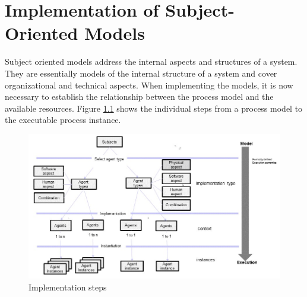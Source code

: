 
\chapter{Implementation of Subject-Oriented Models}

Subject oriented models address the internal aspects and structures of a system. They are essentially models of the internal structure of a system and cover organizational and technical aspects. When implementing the models, it is now necessary to establish the relationship between the process model and the available resources. Figure \ref{fig:Implementation-steps} shows the individual steps from a process model to the executable process instance.

\begin{figure}[h]
	\centering
	\includegraphics[width=0.9\linewidth]{Figures/Implementation/Implementation-steps.jpg}
	\caption[Implementation steps]{Implementation steps}
	\label{fig:Implementation-steps}
\end{figure}
 
